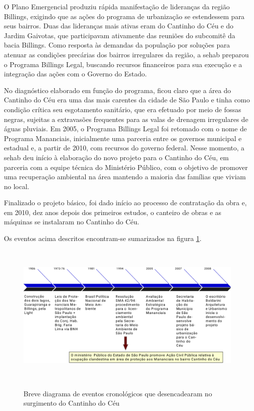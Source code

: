 	O Plano Emergencial produziu rápida manifestação de lideranças da região Billings, exigindo que as ações do programa de urbanização se estendessem para seus bairros. Duas das lideranças mais ativas eram do Cantinho do Céu e do Jardim Gaivotas, que participavam ativamente das reuniões do subcomitê da bacia Billings.
	Como resposta às demandas da população por soluções para atenuar as condições precárias dos bairros irregulares da região, a \gls{sehab} preparou o Programa Billings Legal, buscando recursos financeiros para sua execução e a integração das ações com o Governo do Estado.
	
	No diagnóstico elaborado em função do programa, ficou claro que a área do Cantinho do Céu era uma das mais carentes da cidade de São Paulo e tinha como condição crítica seu esgotamento sanitário, que era efetuado por meio de fossas negras, sujeitas a extravasões frequentes para as valas de drenagem irregulares de águas pluviais.
	Em 2005, o Programa Billings Legal foi retomado com o nome de Programa Mananciais, inicialmente uma parceria entre os governos municipal e estadual e, a partir de 2010, com recursos do governo federal. Nesse momento, a \gls{sehab} deu início à elaboração do novo projeto para o Cantinho do Céu, em parceria com a equipe técnica do Ministério Público, com o objetivo de promover uma recuperação ambiental na área mantendo a maioria das famílias que viviam no local.
	
	Finalizado o projeto básico, foi dado início ao processo de contratação da obra e, em 2010, dez anos depois dos primeiros estudos, o canteiro de obras e as máquinas se instalaram no Cantinho do Céu. \cite{Barda2012}
	
	Os eventos acima descritos encontram-se sumarizados na figura \ref*{fig:cronologia}.
	
	\begin{figure}[H]
		\centering
		\caption[Cronologia do surgimento do Cantinho do Céu]{Breve diagrama de eventos cronológicos que desencadearam no surgimento do Cantinho do Céu}
		\includegraphics[height=7cm]{img/cronologia}
		\label{fig:cronologia}
	\end{figure}
	
